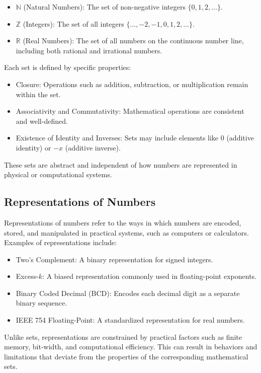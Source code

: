 \begin{itemize}
    \item \( \mathbb{N} \) (Natural Numbers): The set of non-negative integers \( \{0, 1, 2, \dots\} \).
    \item \( \mathbb{Z} \) (Integers): The set of all integers \( \{\dots, -2, -1, 0, 1, 2, \dots\} \).
    \item \( \mathbb{R} \) (Real Numbers): The set of all numbers on the continuous number line, including both rational and irrational numbers.
\end{itemize}

Each set is defined by specific properties:
\begin{itemize}
    \item Closure: Operations such as addition, subtraction, or multiplication remain within the set.
    \item Associativity and Commutativity: Mathematical operations are consistent and well-defined.
    \item Existence of Identity and Inverses: Sets may include elements like \( 0 \) (additive identity) or \( -x \) (additive inverse).
\end{itemize}

These sets are abstract and independent of how numbers are represented in physical or computational systems.

\subsection{Representations of Numbers}
Representations of numbers refer to the ways in which numbers are encoded, stored, and manipulated in practical systems, such as computers or calculators. Examples of representations include:

\begin{itemize}
    \item Two's Complement: A binary representation for signed integers.
    \item Excess-\( k \): A biased representation commonly used in floating-point exponents.
    \item Binary Coded Decimal (BCD): Encodes each decimal digit as a separate binary sequence.
    \item IEEE 754 Floating-Point: A standardized representation for real numbers.
\end{itemize}

Unlike sets, representations are constrained by practical factors such as finite memory, bit-width, and computational efficiency. This can result in behaviors and limitations that deviate from the properties of the corresponding mathematical sets.


